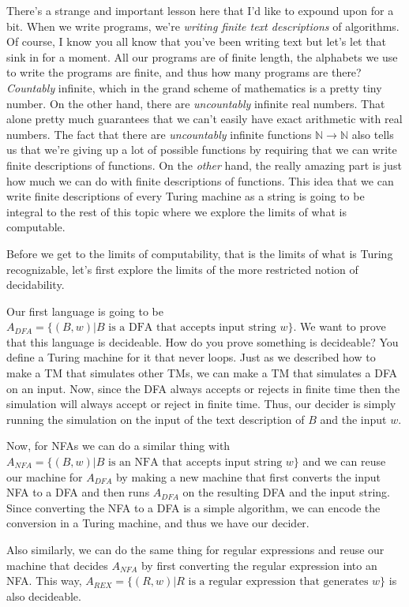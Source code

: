 \documentclass[11pt]{article}
\begin{document}
There's a strange and important lesson here that I'd like to expound upon for a bit. When we write programs, we're \emph{writing finite text descriptions} of algorithms. Of course, I know you all know that you've been writing text but let's let that sink in for a moment. All our programs are of finite length, the alphabets we use to write the programs are finite, and thus how many programs are there? \emph{Countably} infinite, which in the grand scheme of mathematics is a pretty tiny number. On the other hand, there are \emph{uncountably} infinite real numbers. That alone pretty much guarantees that we can't easily have exact arithmetic with real numbers. The fact that there are \emph{uncountably} infinite functions $\mathbb{N} \to \mathbb{N}$ also tells us that we're giving up a lot of possible functions by requiring that we can write finite descriptions of functions. On the \emph{other} hand, the really amazing part is just how much we can do with finite descriptions of functions. This idea that we can write finite descriptions of every Turing machine as a string is going to be integral to the rest of this topic where we explore the limits of what is computable.

Before we get to the limits of computability, that is the limits of what is Turing recognizable, let's first explore the limits of the more restricted notion of decidability. 

Our first language is going to be $A_{DFA} = \{(B,w)| B \text{ is a DFA that accepts input string } w\}$. We want to prove that this language is decideable. How do you prove something is decideable? You define a Turing machine for it that never loops. Just as we described how to make a TM that simulates other TMs, we can make a TM that simulates a DFA on an input. Now, since the DFA always accepts or rejects in finite time then the simulation will always accept or reject in finite time. Thus, our decider is simply running the simulation on the input of the text description of $B$ and the input $w$. 

Now, for NFAs we can do a similar thing with $A_{NFA} = \{(B,w) | B \text{ is an NFA that accepts input string } w\}$ and we can reuse our machine for $A_{DFA}$ by making a new machine that first converts the input NFA to a DFA and then runs $A_{DFA}$ on the resulting DFA and the input string. Since converting the NFA to a DFA is a simple algorithm, we can encode the conversion in a Turing machine, and thus we have our decider. 

Also similarly, we can do the same thing for regular expressions and reuse our machine that decides $A_{NFA}$ by first converting the regular expression into an NFA. This way, $A_{REX} = \{(R,w) | R \text{ is a regular expression that generates } w\}$ is also decideable. 
\end{document}

